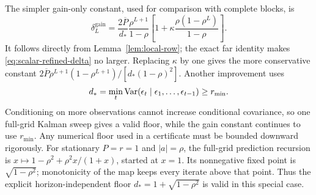 The simpler gain-only constant, used for comparison with complete blocks,
is
\begin{equation}
 \delta_L^{\mathrm{gain}}=
 \frac{2\overline P}{d_*}\frac{\rho^{L+1}}{1-\rho}
 \left[1+\kappa\frac{\rho(1-\rho^L)}{1-\rho}\right].
 \label{eq:gain-delta}
\end{equation}
It follows directly from Lemma~\ref{lem:local-row}; the exact far identity
makes \eqref{eq:scalar-refined-delta} no larger. Replacing $\kappa$ by one
gives the more conservative constant
$2\overline P\rho^{L+1}(1-\rho^{L+1})/[d_*(1-\rho)^2]$.
Another improvement uses
\begin{equation}
 d_* =\min_t\operatorname{Var}(\epsilon_t\mid\epsilon_1,\ldots,\epsilon_{t-1})
 \ge r_{\min}.
 \label{eq:full-grid-floor}
\end{equation}
Conditioning on more observations cannot increase conditional covariance,
so one full-grid Kalman sweep gives a valid floor, while the gain constant
continues to use $r_{\min}$. Any numerical floor used in a certificate must
be bounded downward rigorously.
For stationary $P=r=1$ and $|a|=\rho$, the full-grid prediction recursion
is $x\mapsto1-\rho^2+\rho^2x/(1+x)$, started at $x=1$.
Its nonnegative fixed point is $\sqrt{1-\rho^2}$; monotonicity of the map
keeps every iterate above that point. Thus the explicit horizon-independent
floor $d_*=1+\sqrt{1-\rho^2}$ is valid in this special case.

